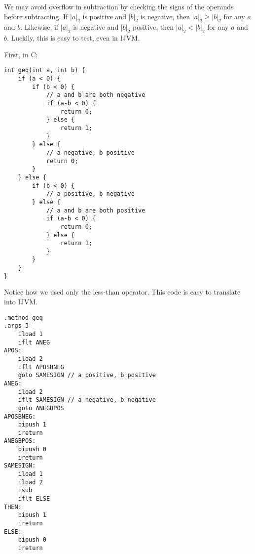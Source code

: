 \documentclass[12pt,a4paper]{article}
\begin{document}
We may avoid overflow in subtraction by checking the signs of the operands
before subtracting. If $|a|_2$ is positive and $|b|_2$ is negative, then
$|a|_2\geq |b|_2$ for any $a$ and $b$. Likewise, if $|a|_2$ is negative and
$|b|_2$ positive, then $|a|_2<|b|_2$ for any $a$ and $b$. Luckily, this is easy
to test, even in IJVM.

First, in C:

\lstset{language=C}
\begin{lstlisting}
int geq(int a, int b) {
	if (a < 0) {
		if (b < 0) {
			// a and b are both negative
			if (a-b < 0) {
				return 0;
			} else {
				return 1;
			}
		} else {
			// a negative, b positive
			return 0;
		}
	} else {
		if (b < 0) {
			// a positive, b negative
		} else {
			// a and b are both positive
			if (a-b < 0) {
				return 0;
			} else {
				return 1;
			}
		}
	}
}
\end{lstlisting}
Notice how we used only the less-than operator. This code is easy to translate into IJVM.
\lstset{language=JVMIS}
\begin{lstlisting}
.method geq
.args 3
	iload 1
	iflt ANEG
APOS:
	iload 2
	iflt APOSBNEG
	goto SAMESIGN // a positive, b positive
ANEG:
	iload 2
	iflt SAMESIGN // a negative, b negative
	goto ANEGBPOS
APOSBNEG:
	bipush 1
	ireturn
ANEGBPOS:
	bipush 0
	ireturn
SAMESIGN:
	iload 1
	iload 2
	isub
	iflt ELSE
THEN:
	bipush 1
	ireturn
ELSE:
	bipush 0
	ireturn
\end{lstlisting}
\end{document}
